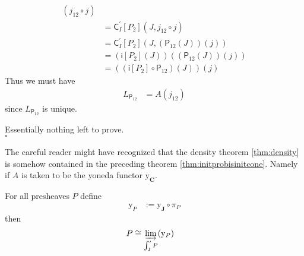 \begin{cst}
\begin{align*}
  \left(
    j_{12}
    \circ
    j
  \right)
  \\
  &=
  \mathsf{C}_{I}^{\prime}[P_{2}]
  \left(
    J,
    j_{12}
    \circ
    j
  \right)
  \\
  &=
  \mathsf{C}_{I}^{\prime}[P_{2}]
  \left(
    J,
    \left(
      \mathsf{P}_{12}(J)
    \right)
    (j)
  \right)
  \\
  &=
  \left(
    \mathsf{i}[P_{2}](J)
  \right)
  \left(
    \left(
      \mathsf{P}_{12}(J)
    \right)
    (j)
  \right)
  \\
  &=
  \left(
    \left(
      \mathsf{i}[P_{2}]
      \circ
      \mathsf{P}_{12}
    \right)
    (J)
  \right)
  (j)
\end{align*}
Thus we must have
\begin{align*}
  L_{\mathsf{P}_{12}}
  &=
  A(j_{12})
\end{align*}
since $L_{\mathsf{P}_{12}}$ is unique.
\end{cst}
\begin{prf}
Essentially nothing left to prove.
\\
\phantom{proven}
\hfill
$\square$
\end{prf}
The careful reader might have recognized that the density theorem \ref{thm:density} is somehow contained in the preceding theorem \ref{thm:initprobisinitcone}. Namely if $A$ is taken to be the yoneda functor $\mathrm{y}_{\mathbf{C}}$.
\\
\begin{cor}[density]
\label{cor:density}
For all presheaves $P$ define
\begin{align*}
  \mathrm{y}_{P}
  &:=
  \mathrm{y}_{\mathbf{J}}
  \circ
  \pi_{P}
\end{align*}
then
\begin{align*}
  P
  &\cong
  \varinjlim_{\int_{\mathbf{J}}^{\prime}P}(\mathrm{y}_{P})
\end{align*}
\end{cor}

